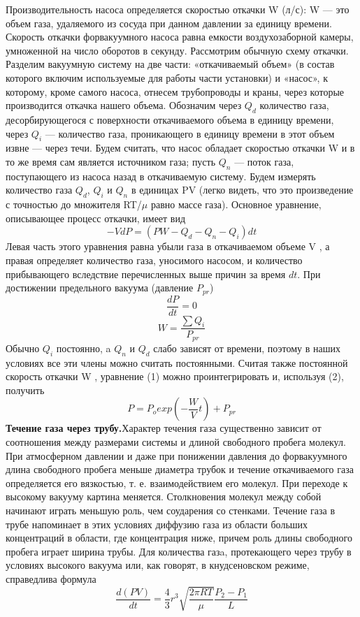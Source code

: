 \documentclass[12pt]{article}
\begin{document}
Производительность насоса определяется скоростью откачки W (л/с): W — это объем газа, удаляемого из сосуда при данном давлении за единицу времени. Скорость откачки форвакуумного насоса равна емкости воздухозаборной камеры, умноженной на число оборотов в секунду.
Рассмотрим обычную схему откачки. Разделим вакуумную систему на две части: «откачиваемый объем» (в состав которого включим используемые для работы части установки) и «насос», к которому, кроме самого насоса, отнесем трубопроводы и краны, через которые
производится откачка нашего объема. Обозначим через $Q_d$ количество газа, десорбирующегося с поверхности откачиваемого объема в единицу времени, через $Q_i$ — количество газа, проникающего в единицу времени в этот объем извне — через течи. Будем считать, что насос обладает скоростью откачки W и в то же время сам является источником газа; пусть $Q_n$ — поток газа, поступающего из насоса назад в откачиваемую систему. Будем измерять количество газа $Q_d$, $Q_i$ и $Q_n$ в единицах PV (легко видеть, что это произведение с точностью до множителя RT/$\mu$ равно массе газа). Основное уравнение, описывающее процесс откачки, имеет вид
$$-VdP=(PW-Q_d-Q_n-Q_i)dt$$
Левая часть этого уравнения равна убыли газа в откачиваемом объеме V , а правая определяет количество газа, уносимого насосом, и количество прибывающего вследствие перечисленных выше причин
за время $dt$. При достижении предельного вакуума (давление $P_{pr}$)
$$\frac{dP}{dt}=0$$
$$W=\frac{\sum Q_i}{P_{pr}}$$
Обычно $Q_i$ постоянно, a $Q_n$ и $Q_d$ слабо зависят от времени, поэтому в наших условиях все эти члены можно считать постоянными. Считая также постоянной скорость откачки W , уравнение (1) можно проинтегрировать и, используя (2), получить
$$P=P_o exp(-\frac{W}{V}t) + P_{pr}$$
\textbf{Течение газа через трубу.}Характер течения газа существенно зависит от соотношения между размерами системы и длиной свободного пробега молекул. При атмосферном давлении и даже при понижении давления до форвакуумного длина свободного пробега меньше диаметра трубок и течение откачиваемого газа определяется его вязкостью, т. е. взаимодействием его молекул. При переходе к высокому вакууму картина меняется. Столкновения молекул между собой начинают играть меньшую роль, чем соударения со стенками. Течение газа в трубе напоминает в этих условиях диффузию газа из области больших концентраций в области, где концентрация ниже, причем роль длины свободного пробега играет ширина трубы.
Для количества газa, протекающего через трубу в условиях высокого вакуума или, как говорят, в кнудсеновском режиме, справедлива формула
$$\frac{d(PV)}{dt}=\frac{4}{3}r^3 \sqrt{\frac{2\pi RT}{\mu}} \frac{P_2-P_1}{L}$$
\end{document}
